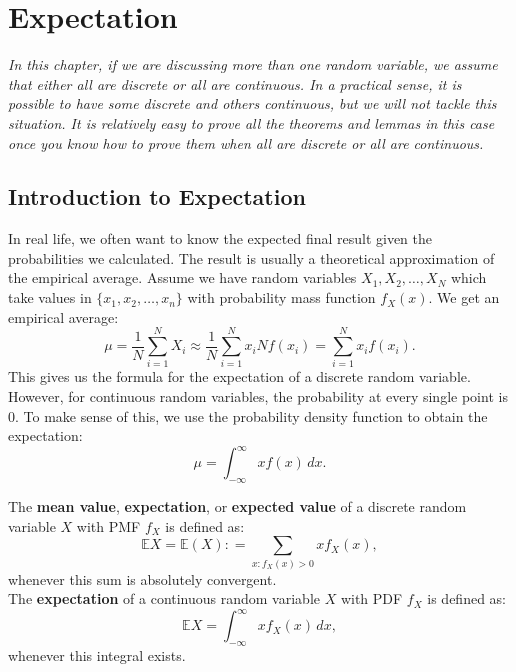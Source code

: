 \documentclass{huhtakm-template-book-v2}
\newcommand{\expect}{\mathbb{E}}
\begin{document}
\chapter{Expectation}
    \label{Chapter 6 (Expectation)}
    \textit{In this chapter, if we are discussing more than one random variable, we assume that either all are discrete or all are continuous. In a practical sense, it is possible to have some discrete and others continuous, but we will not tackle this situation. It is relatively easy to prove all the theorems and lemmas in this case once you know how to prove them when all are discrete or all are continuous.}
\section{Introduction to Expectation}
    In real life, we often want to know the expected final result given the probabilities we calculated. The result is usually a theoretical approximation of the empirical average. Assume we have random variables $X_{1},X_{2},\dots,X_{N}$ which take values in $\{x_{1},x_{2},\dots,x_{n}\}$ with probability mass function $f_{X}(x)$. We get an empirical average:
    \begin{equation*}
        \mu = \frac{1}{N}\sum_{i = 1}^{N}X_{i} \approx \frac{1}{N}\sum_{i = 1}^{N}x_{i}Nf(x_{i}) = \sum_{i = 1}^{N}x_{i}f(x_{i}).
    \end{equation*}
    This gives us the formula for the expectation of a discrete random variable. However, for continuous random variables, the probability at every single point is $0$. To make sense of this, we use the probability density function to obtain the expectation:
    \begin{equation*}
        \mu = \int_{-\infty}^{\infty}xf(x)\,dx.
    \end{equation*}
    \begin{defn}
        The \textbf{mean value}, \textbf{expectation}, or \textbf{expected value} of a discrete random variable $X$ with PMF $f_{X}$ is defined as:
        \begin{equation*}
            \expect{X} = \expect(X): = \sum_{x:f_{X}(x) > 0}xf_{X}(x),
        \end{equation*}
        whenever this sum is absolutely convergent.\\
        The \textbf{expectation} of a continuous random variable $X$ with PDF $f_{X}$ is defined as:
        \begin{equation*}
            \expect{X} = \int_{-\infty}^{\infty}xf_{X}(x)\,dx,
        \end{equation*}
        whenever this integral exists.
    \end{defn}
\end{document}
